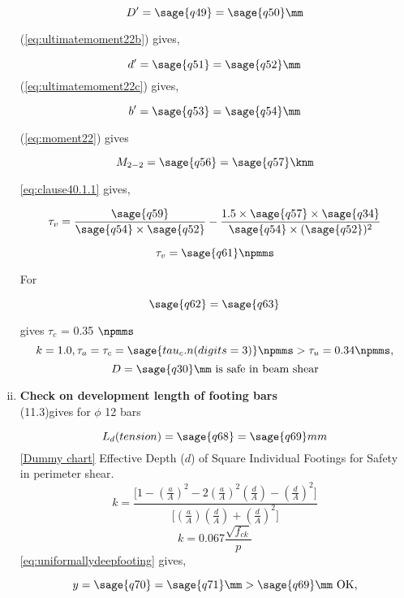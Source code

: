 \begin{example}
\begin{enumerate}[(i)]
  $$D' = \sage{q49} = \sage{q50} \mm$$
  
  \eqn (\ref{eq:ultimatemoment22b}) gives,
  
  
  $$d' = \sage{q51} = \sage{q52} \mm$$ 
 \eqn (\ref{eq:ultimatemoment22c}) gives,

  $$b' = \sage{q53} = \sage{q54} \mm$$
  
  \eqn (\ref{eq:moment22}) gives

  $$M_{2-2} = \sage{q56} = \sage{q57} \knm$$
  
  \eqn \ref{eq:clause40.1.1} gives,
  
  $$\tau_v = \frac{\sage{q59}}{\sage{q54} \times \sage{q52}}-\frac{1.5 \times \sage{q57} \times \sage{q34}}{\sage{q54} \times (\sage{q52})^2}$$

  $$\tau_v = \sage{q61} \npmms$$
  
  For

  $$\sage{q62} = \sage{q63}$$

   gives ${\tau_c}$ = 0.35 $\npmms$
  $$k = 1.0,  {\tau_a} = {\tau_c} = \sage{tau_c.n(digits=3)} \npmms > {\tau_u}=0.34 \npmms,$$
  $$D = \sage{q30} \text{$\mm$ is safe in beam shear}$$  

 \item  \textbf{Check on development length of footing bars}\\
\tablem (11.3)gives for $\phi$ 12 bars

$$L_d (tension) = \sage{q68} = \sage{q69} mm$$
\chartm \ref{Dummy chart} Effective Depth ($d$) of Square Individual Footings for Safety in perimeter shear.
$$k=\frac{\Bigg[1-\left(\frac{a}{A}\right)^2
-2\left(\frac{a}{A}\right)^2\left( \frac{d}{A}\right)-\left(\frac{d}{A}\right)^2\Bigg]}{\Bigg[\left(\frac{a}{A}\right)\left(\frac{d}{A}\right)+\left(\frac{d}{A}\right)^2\Bigg]}$$
$$k=0.067\frac{\sqrt{f_{ck}}}{p}$$
\eqn \ref{eq:uniformallydeepfooting} gives,

$$y = \sage{q70} = \sage{q71} \mm > \sage{q69} \mm \text{ OK,}$$
\end{enumerate}
\end{example}
